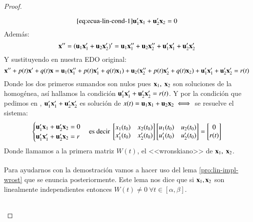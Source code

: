 \begin{proof}
\begin{enumerate}
    \begin{equation}\ref{eq:ecua-lin-cond-1}
        \mathbf{u}_1' \mathbf{x}_1 + \mathbf{u}_2' \mathbf{x}_2 = 0
    \end{equation}
    Además:
    $$
        \mathbf{x}'' = (\mathbf{u}_1 \mathbf{x}_1' + \mathbf{u}_2 \mathbf{x}_2')' = \mathbf{u}_1 \mathbf{x}_1'' + \mathbf{u}_2 \mathbf{x}_2'' + \mathbf{u}_1' \mathbf{x}_1' + \mathbf{u}_2' \mathbf{x}_2'
    $$
    Y sustituyendo en nuestra EDO original:
    $$
        \mathbf{x}'' + p(t) \mathbf{x}' + q(t) \mathbf{x} = \mathbf{u}_1 ( \mathbf{x}_1'' + p(t) \mathbf{x}_1' + q(t) \mathbf{x}_1) + \mathbf{u}_2 ( \mathbf{x}_2'' + p(t) \mathbf{x}_2' + q(t) \mathbf{x}_2)  + \mathbf{u}_1' \mathbf{x}_1' + \mathbf{u}_2' \mathbf{x}_2' = r(t)
    $$
    Donde los dos primeros sumandos son nulos pues $\mbf{x}_1,\ \mbf{x}_2$ son soluciones de la homogénea, así hallamos la condición $\mathbf{u}_1' \mathbf{x}_1' + \mathbf{u}_2' \mathbf{x}_2' = r(t)$. Y por la condición que pedimos en \label{eq:ecua-lin-cond-1}, $\mathbf{u}_1' \mathbf{x}_1' + \mathbf{u}_2' \mathbf{x}_2'$ es solución de $x(t) = \mathbf{u}_1 \mathbf{x}_1 + \mathbf{u}_2 \mathbf{x}_2 \iff$ se resuelve el sistema:
    $$
        \begin{cases}
            \mathbf{u}_1' \mathbf{x}_1 + \mathbf{u}_2' \mathbf{x}_2 = 0\\
            \mathbf{u}_1' \mathbf{x}_1' + \mathbf{u}_2' \mathbf{x}_2 = r
        \end{cases} \text{es decir }
        \left[
        \begin{matrix}
            x_1(t_0) & x_2(t_0)\\
            x_1'(t_0) & x_2'(t_0)
        \end{matrix}
        \right]
        \left[
        \begin{matrix}
            u_1(t_0) & u_2(t_0)\\
            u_1'(t_0) & u_2'(t_0)
        \end{matrix}
        \right] =
        \left[
        \begin{matrix}
            0\\
            r(t)
        \end{matrix}
        \right]
    $$
    Donde llamamos a la primera matriz $W(t)$, el <<wronskiano>> de $\mbf{x}_1,\ \mbf{x}_2$.\\\\
    Para ayudarnos con la demostración vamos a hacer uso del lema \ref{pro:lin-impl-wrost} que se enuncia posteriormente. Este lema nos dice que si $\mathbf{x}_1, \mathbf{x}_2$ son linealmente independientes entonces $W(t) \neq 0\ \forall t\in[\alpha, \beta]$.\\\\

\end{enumerate}
\end{proof}
